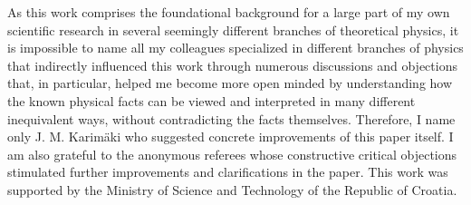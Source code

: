 \documentclass[12pt]{article}
\begin{document}
As this work comprises the foundational background for a large part 
of my own scientific research in several seemingly different branches 
of theoretical physics, it is impossible to name all my colleagues 
specialized in different branches of physics that indirectly 
influenced this work through numerous discussions and objections
that, in particular, helped me become more open minded by 
understanding how the known physical facts can be viewed 
and interpreted in many different inequivalent ways, without 
contradicting the facts themselves.
Therefore, I name only J. M. Karim\"aki who suggested 
concrete improvements of this paper itself.   
I am also grateful to the anonymous referees whose constructive critical
objections stimulated further improvements and clarifications
in the paper.
This work was supported by the Ministry of Science and Technology of the
Republic of Croatia. 
\end{document}
